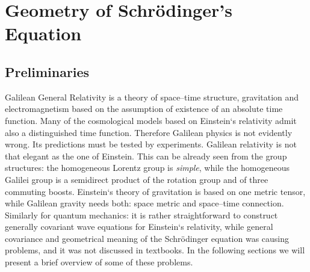 \documentclass[12pt]{article}
\begin{document}
\section{Geometry of Schr\"odinger's Equation}
\subsection{Preliminaries}
Galilean General Relativity is a theory of space--time
structure,  gravitation and electromagnetism based on the
assumption of existence of an absolute time function.  Many of the
cosmological models based on Einstein`s relativity admit also a 
distinguished time function.  Therefore Galilean physics is not
evidently wrong.  Its predictions must be tested by experiments. 
Galilean relativity is not
that elegant as the one of Einstein.  This can be already seen
from the group structures:  the homogeneous Lorentz group is
{\sl simple},  while the homogeneous Galilei group is a semidirect
product of the rotation group and of three commuting boosts.
Einstein`s theory of gravitation is based on one metric tensor, 
while Galilean gravity needs both:  space metric and space--time
connection.  Similarly for quantum mechanics:  it is rather
straightforward to construct generally covariant wave equations
for Einstein`s relativity,  while general covariance and
geometrical meaning of the Schr\"{o}dinger equation was causing
problems,  and it was not discussed in textbooks.  In the
following sections we will present a brief overview of some
of these problems. 
\end{document}
